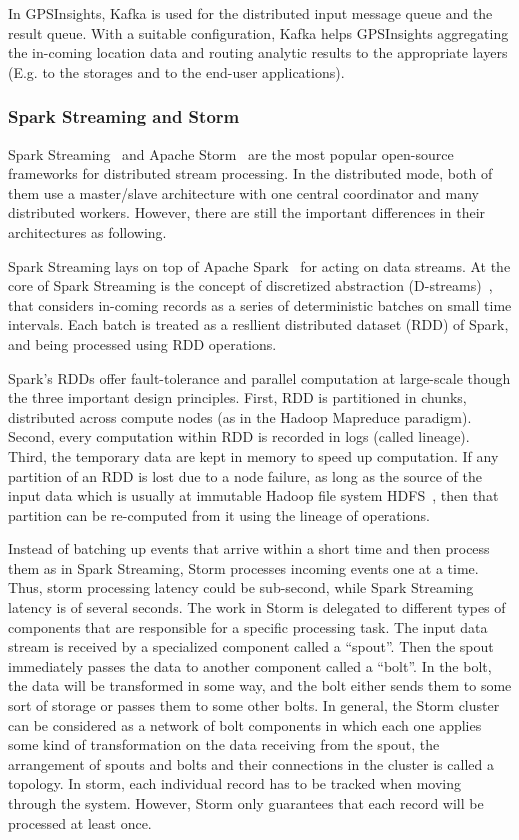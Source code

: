 \documentclass{acm_proc_article-sp}
\begin{document}
In GPSInsights, Kafka is used for the distributed input message queue and the result queue. With a suitable configuration, Kafka helps GPSInsights aggregating the in-coming location data and routing analytic results to the appropriate layers (E.g. to the storages and to the end-user applications).

\subsubsection{Spark Streaming and Storm}

Spark Streaming~\cite{learningsparkbook,sparkstreamingweb} and Apache Storm~\cite{stormappliedbook,apachestormweb} are the most popular open-source frameworks for distributed stream processing. In the distributed mode, both of them use a master/slave architecture with one central coordinator and many distributed workers. However, there are still the important differences in their architectures as following.

Spark Streaming lays on top of Apache Spark~\cite{Zaharia:2010:Spark} for acting on data streams.
 At the core of Spark Streaming is the concept of discretized abstraction (D-streams)~\cite{Zaharia:2013:Discretized,Zaharia:2012:Discretized}, that considers in-coming records as a series of deterministic batches on small time intervals. Each batch is treated as a resllient distributed dataset (RDD) of Spark, and being processed using RDD operations. 

Spark's RDDs offer fault-tolerance and parallel computation at large-scale though the three important design principles. First, RDD is partitioned in chunks, distributed across compute nodes (as in the Hadoop Mapreduce paradigm). Second, every computation within RDD is recorded in logs (called lineage). Third, the temporary data are kept in memory to speed up computation. If any partition of an RDD is lost due to a node failure, as long as the source of the input data which is usually at immutable Hadoop file system HDFS~\cite{shvachko2010hadoop}, then that partition can be re-computed from it using the lineage of operations.

Instead of batching up events that arrive within a short time and then process them as in Spark Streaming, Storm processes incoming events one at a time. Thus, storm processing latency could be sub-second, while Spark Streaming latency is of several seconds. The work in Storm is delegated to different types of components that are responsible for a specific processing task. The input data stream is received by a specialized component called a ``spout''. Then the spout immediately passes the data to another component called a ``bolt''. In the bolt, the data will be transformed in some way, and the bolt either sends them to some sort of storage or passes them to some other bolts. In general, the Storm cluster can be considered as a network of bolt components in which each one applies some kind of transformation on the data receiving from the spout, the arrangement of spouts and bolts and their connections in the cluster is called a topology. In storm, each individual record has to be tracked when moving through the system. However, Storm only guarantees that each record will be processed at least once.
\end{document}
